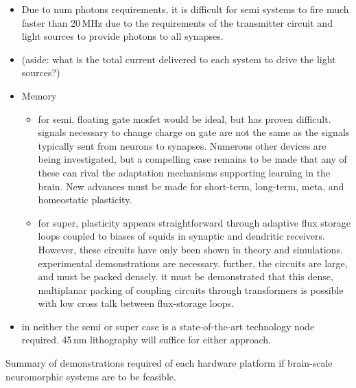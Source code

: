\documentclass[onecolumn]{article}
\begin{document}
\begin{itemize}
\item Due to num photons requirements, it is difficult for semi systems to fire much faster than 20\,MHz due to the requirements of the transmitter circuit and light sources to provide photons to all synapses.

\item (aside: what is the total current delivered to each system to drive the light sources?)

\item Memory
\begin{itemize}
\item for semi, floating gate mosfet would be ideal, but has proven difficult. signals necessary to change charge on gate are not the same as the signals typically sent from neurons to synapses. Numerous other devices are being investigated, but a compelling case remains to be made that any of these can rival the adaptation mechanisms supporting learning in the brain. New advances must be made for short-term, long-term, meta, and homeostatic plasticity.
\item for super, plasticity appears straightforward through adaptive flux storage loops coupled to biases of squids in synaptic and dendritic receivers. However, these circuits have only been shown in theory and simulations. experimental demonstrations are necessary. further, the circuits are large, and must be packed densely. it must be demonstrated that this dense, multiplanar packing of coupling circuits through transformers is possible with low cross talk between flux-storage loops.
\end{itemize}

\item in neither the semi or super case is a state-of-the-art technology node required. 45\,nm lithography will suffice for either approach.

\end{itemize}

\vspace{3em}

Summary of demonstrations required of each hardware platform if brain-scale neuromorphic systems are to be feasible.\newline
\end{document}
